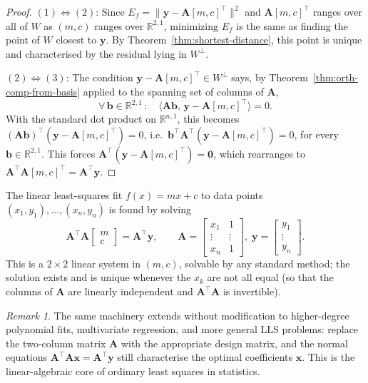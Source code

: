 \documentclass[11pt, a4paper, notitlepage]{report}
\theoremstyle{definition}
\theoremstyle{remark}
\newtheorem{remark}[theorem]{Remark}
\begin{document}
\begin{proof}
$(1)\Leftrightarrow(2)$: Since $E_f = \|\mathbf{y} - \mathbf{A}[m,c]^\top\|^2$
and $\mathbf{A}[m,c]^\top$ ranges over all of $W$ as $(m,c)$ ranges over
$\mathbb{R}^{2,1}$, minimizing $E_f$ is the same as finding the point of $W$
closest to $\mathbf{y}$. By Theorem~\ref{thm:shortest-distance}, this point
is unique and characterised by the residual lying in $W^\perp$.

$(2)\Leftrightarrow(3)$: The condition $\mathbf{y} - \mathbf{A}[m,c]^\top\in W^\perp$
says, by Theorem~\ref{thm:orth-comp-from-basis} applied to the spanning set
of columns of $\mathbf{A}$,
\[
  \forall\,\mathbf{b}\in\mathbb{R}^{2,1}\,:\quad \langle\mathbf{A}\mathbf{b},\,\mathbf{y} - \mathbf{A}[m,c]^\top\rangle = 0.
\]
With the standard dot product on $\mathbb{R}^{n,1}$, this becomes
$(\mathbf{A}\mathbf{b})^\top(\mathbf{y} - \mathbf{A}[m,c]^\top) = 0$, i.e.\
$\mathbf{b}^\top\mathbf{A}^\top(\mathbf{y} - \mathbf{A}[m,c]^\top) = 0$, for every $\mathbf{b}\in\mathbb{R}^{2,1}$.
This forces $\mathbf{A}^\top(\mathbf{y} - \mathbf{A}[m,c]^\top) = \mathbf{0}$, which rearranges to
$\mathbf{A}^\top\mathbf{A}[m,c]^\top = \mathbf{A}^\top\mathbf{y}$.
\end{proof}

\begin{keyresult}[title={Key Result: The Normal Equations}]
The linear least-squares fit $f(x) = mx + c$ to data points
$(x_1,y_1),\ldots,(x_n,y_n)$ is found by solving
\[
  \mathbf{A}^\top\mathbf{A}\begin{bmatrix}m\\c\end{bmatrix} = \mathbf{A}^\top\mathbf{y},
  \qquad
  \mathbf{A} = \begin{bmatrix}x_1 & 1\\\vdots & \vdots\\ x_n & 1\end{bmatrix},\;
  \mathbf{y} = \begin{bmatrix}y_1\\\vdots\\y_n\end{bmatrix}.
\]
This is a $2\times 2$ linear system in $(m,c)$, solvable by any standard method;
the solution exists and is unique whenever the $x_k$ are not all equal (so that
the columns of $\mathbf{A}$ are linearly independent and $\mathbf{A}^\top\mathbf{A}$
is invertible).
\end{keyresult}

\begin{remark}
The same machinery extends without modification to higher-degree polynomial
fits, multivariate regression, and more general LLS problems: replace the
two-column matrix $\mathbf{A}$ with the appropriate design matrix, and the
normal equations $\mathbf{A}^\top\mathbf{A}\mathbf{x} = \mathbf{A}^\top\mathbf{y}$
still characterise the optimal coefficients $\mathbf{x}$. This is the
linear-algebraic core of ordinary least squares in statistics.
\end{remark}
\end{document}

